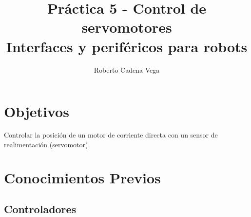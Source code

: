 



\title{Práctica 5 - Control de servomotores\\Interfaces y periféricos para robots}
\author{Roberto Cadena Vega} %
\date{}



\maketitle %


\section{Objetivos}

	Controlar la posición de un motor de corriente directa con un sensor de realimentación (servomotor).


\section{Conocimientos Previos}


	\subsection{Controladores}


